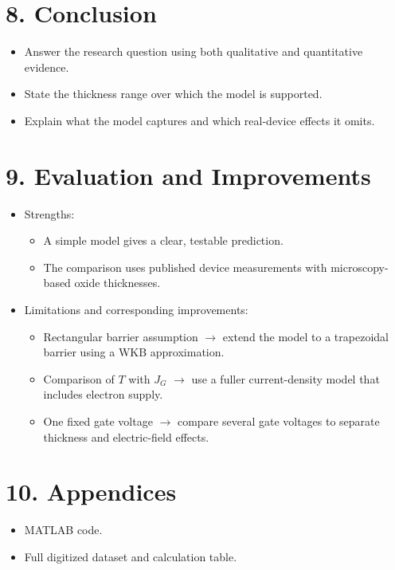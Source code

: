 \documentclass[12pt]{article}
\begin{document}
\section*{8. Conclusion}
\begin{itemize}
    \item Answer the research question using both qualitative and quantitative evidence.
    \item State the thickness range over which the model is supported.
    \item Explain what the model captures and which real-device effects it omits.
\end{itemize}

\section*{9. Evaluation and Improvements}
\begin{itemize}
    \item Strengths:
    \begin{itemize}
        \item A simple model gives a clear, testable prediction.
        \item The comparison uses published device measurements with microscopy-based oxide thicknesses.
    \end{itemize}
    \item Limitations and corresponding improvements:
    \begin{itemize}
        \item Rectangular barrier assumption \(\rightarrow\) extend the model to a trapezoidal barrier using a WKB approximation.
        \item Comparison of \(T\) with \(J_G\) \(\rightarrow\) use a fuller current-density model that includes electron supply.
        \item One fixed gate voltage \(\rightarrow\) compare several gate voltages to separate thickness and electric-field effects.
    \end{itemize}
\end{itemize}


\section*{10. Appendices}
\begin{itemize}
    \item MATLAB code.
    \item Full digitized dataset and calculation table.
\end{itemize}

\newpage
{}

\end{document}
